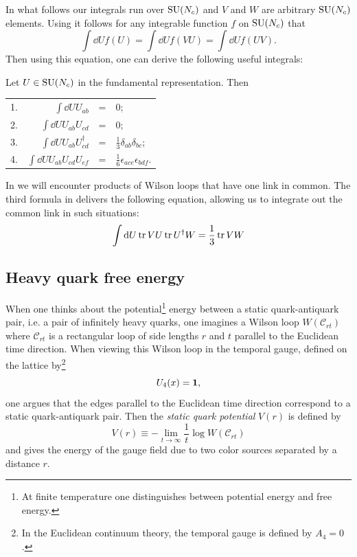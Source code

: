 In what follows our integrals run over $\operatorname{SU}(N_c)$
and $V$ and $W$ are arbitrary $\operatorname{SU}(N_c)$ elements.
Using  it follows for any 
integrable function $f$ on $\operatorname{SU}(N_c)$ that
\begin{equation}
  \int\dd Uf(U)=\int\dd Uf(VU)=\int\dd Uf(UV).
\end{equation}
Then using this equation, one can derive the following
useful integrals:
\begin{proposition}{}{}\label{prp:haar}
  Let $U\in\operatorname{SU}(N_c)$ in the fundamental representation. Then
  \begin{center}\begin{tabular}{lrcl}
  1. &$\int \dd U U_{ab}$ &=& 0;\\[1mm]
  2. &$\int \dd U U_{ab}U_{cd}$ &=& 0;\\[1mm]
  3. &$\int \dd U U_{ab}U^\dagger_{cd}$ 
       &=& $\frac{1}{3}\delta_{ab}\delta_{bc}$;\\[1mm]
  4. &$\int \dd U U_{ab}U_{cd}U_{ef}$ 
       &=& $\frac{1}{6}\epsilon_{ace}\epsilon_{bdf}$.
  \end{tabular}\end{center}
\end{proposition}
In  we will encounter products of Wilson
loops that have one link in common. The third formula in
 delivers the following equation, allowing
us to integrate out the common link in such situations:
\begin{equation}
  \int \dd U\tr VU\tr U^\dagger W=\frac{1}{3}\tr VW
\end{equation}

\subsection{Heavy quark free energy}\label{sec:hqfe}


When one thinks about the potential\footnote{At finite temperature
one distinguishes between potential energy and free energy.}
energy between a static quark-antiquark pair, 
i.e. a pair of infinitely heavy quarks, one imagines
a Wilson loop $W(\mathcal{C}_{rt})$
where $\mathcal{C}_{rt}$ is a rectangular loop of side lengths 
$r$ and $t$ parallel
to the Euclidean time direction. When
viewing this Wilson loop in the temporal gauge, 
defined on the lattice by\footnote{In the Euclidean continuum theory,
the temporal gauge is defined by $A_4=0$.}
\begin{equation}
  U_4(x)={\mathbf 1},
\end{equation}
one argues that
the edges parallel to the Euclidean time direction correspond to
a static quark-antiquark pair.
Then the {\it static quark potential}
 $V(r)$ is defined by
\begin{equation}\label{eq:staticpotential}
  V(r)\equiv-\lim_{t\to\infty}\frac{1}{t}\log W(\mathcal{C}_{rt})  
\end{equation}
and gives the energy of the gauge field due to two color sources separated by
a distance $r$. 


